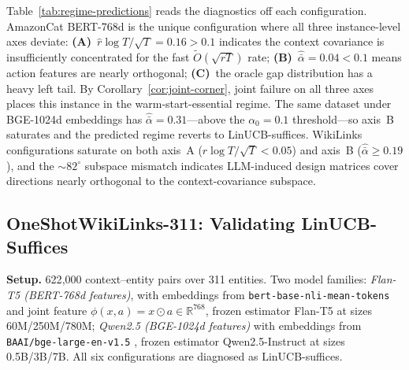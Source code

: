 \documentclass{article}
\theoremstyle{definition}
\theoremstyle{remark}
\theoremstyle{remark}
\begin{document}
Table~\ref{tab:regime-predictions} reads the diagnostics off each
configuration. AmazonCat BERT-768d is the unique configuration where all
three instance-level axes deviate: \textbf{(A)}~$\widehat r\log T/\sqrt T = 0.16 > 0.1$
indicates the context covariance is insufficiently concentrated for the fast
$\widetilde O(\sqrt{rT})$ rate; \textbf{(B)}~$\widehat{\bar\alpha}=0.04 < 0.1$
means action features are nearly orthogonal; \textbf{(C)}~the oracle gap
distribution has a heavy left tail. By Corollary~\ref{cor:joint-corner},
joint failure on all three axes places this instance in the
warm-start-essential regime. The same dataset under BGE-1024d embeddings
has $\widehat{\bar\alpha}=0.31$---above the $\alpha_0=0.1$ threshold---so
axis~B saturates and the predicted regime reverts to LinUCB-suffices.
WikiLinks configurations saturate on both axis~A
($\widehat r\log T/\sqrt T < 0.05$) and axis~B
($\widehat{\bar\alpha}\!\ge\!0.19$), and the $\sim 82^\circ$ subspace
mismatch indicates LLM-induced design matrices cover directions nearly
orthogonal to the context-covariance subspace.

\subsection{OneShotWikiLinks-311: Validating LinUCB-Suffices}
\label{sec:wiki}

\textbf{Setup.} 622{,}000 context--entity pairs over 311 entities. Two model
families: \emph{Flan-T5 (BERT-768d features)}, with embeddings from
\texttt{bert-base-nli-mean-tokens} and joint feature
$\phi(x,a)=x\odot a\in\mathbb{R}^{768}$, frozen estimator Flan-T5
\cite{chung2024scaling} at sizes 60M/250M/780M;
\emph{Qwen2.5 (BGE-1024d features)} with embeddings from
\texttt{BAAI/bge-large-en-v1.5} \cite{xiao2024c}, frozen estimator
Qwen2.5-Instruct \cite{hui2024qwen2} at sizes 0.5B/3B/7B. All six
configurations are diagnosed as LinUCB-suffices.
\end{document}
